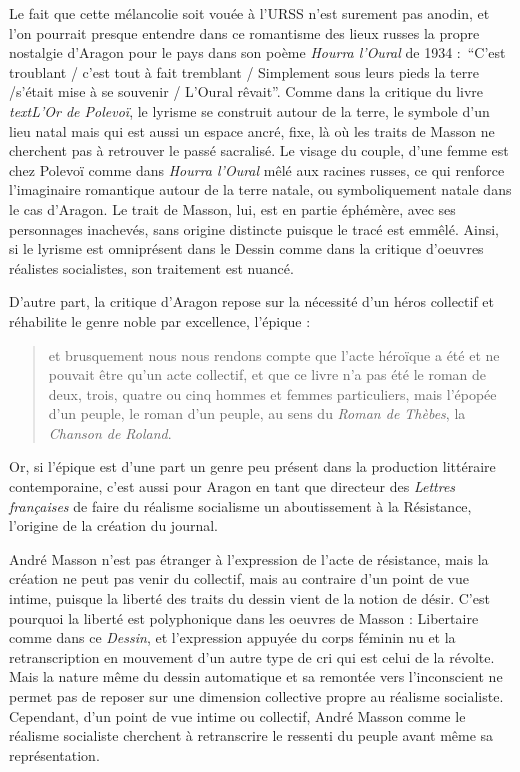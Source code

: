 Le fait que cette mélancolie soit vouée à l’URSS n’est surement pas anodin, et l’on pourrait presque entendre dans ce romantisme des lieux russes la propre nostalgie d’Aragon pour le pays dans son poème \emph{Hourra l’Oural} de 1934 : \enquote{C’est troublant / c’est tout à fait tremblant / Simplement sous leurs pieds la terre /s’était mise à se souvenir / L’Oural rêvait}. Comme dans la critique du livre \emph{textL’Or de Polevoï}, le lyrisme se construit autour de la terre, le symbole d’un lieu natal mais qui est aussi un espace ancré, fixe, là où les traits de Masson ne cherchent pas à retrouver le passé sacralisé. Le visage du couple, d’une femme est chez Polevoï comme dans \emph{Hourra l’Oural} mêlé aux racines russes, ce qui renforce l’imaginaire romantique autour de la terre natale, ou symboliquement natale dans le cas d’Aragon. Le trait de Masson, lui, est en partie éphémère, avec ses personnages inachevés, sans origine distincte puisque le tracé est emmêlé. Ainsi, si le lyrisme est omniprésent dans le Dessin comme dans la critique d’oeuvres réalistes socialistes, son traitement est nuancé.



	D’autre part, la critique d’Aragon repose sur la nécessité d’un héros collectif et réhabilite le genre noble par excellence, l’épique : 
	\begin{quote}
	et brusquement nous nous rendons compte que l’acte héroïque a été et ne pouvait être qu’un acte collectif, et que ce livre n’a pas été le roman de deux, trois, quatre ou cinq hommes et femmes particuliers, mais l’épopée d’un peuple, le roman d’un peuple, au sens du \emph{Roman de Thèbes}, la \emph{Chanson de Roland}.	
	\end{quote}
	
	
	 Or, si l’épique est d’une part un genre peu présent dans la production littéraire contemporaine, c’est aussi pour Aragon en tant que directeur des \emph{Lettres françaises} de faire du réalisme socialisme un aboutissement à la Résistance, l’origine de la création du journal. 

	André Masson n’est pas étranger à l’expression de l’acte de résistance, mais la création ne peut pas venir du collectif, mais au contraire d’un point de vue intime, puisque la liberté des traits du dessin vient de la notion de désir. C’est pourquoi la liberté est polyphonique dans les oeuvres de Masson : Libertaire comme dans ce \emph{Dessin}, et l’expression appuyée du corps féminin nu et la retranscription en mouvement d’un autre type de cri qui est celui de la révolte. Mais la nature même du dessin automatique et sa remontée vers l’inconscient ne permet pas de reposer sur une dimension collective propre au réalisme socialiste. Cependant, d’un point de vue intime ou collectif, André Masson comme le réalisme socialiste cherchent à retranscrire le ressenti du peuple avant même sa représentation. 

